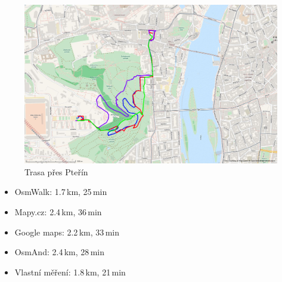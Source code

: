 \begin{figure}[h]
	\centering
	\includegraphics[width=12cm]{../img/ms-sh.png}
	\caption{Trasa přes Pteřín}
	\label{fig:kol-hol}
\end{figure}
\begin{itemize}
	\item OsmWalk: 1.7\,km, 25\,min
	\item Mapy.cz: 2.4\,km, 36\,min
	\item Google maps: 2.2\,km, 33\,min
	\item OsmAnd: 2.4\,km, 28\,min
	\item Vlastní měření: 1.8\,km, 21\,min
\end{itemize}
